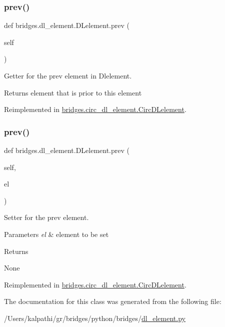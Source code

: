 \subsubsection{\texorpdfstring{prev()}{prev()}\hspace{0.1cm}{\footnotesize\ttfamily [1/2]}}
{\footnotesize\ttfamily def bridges.\+dl\+\_\+element.\+D\+Lelement.\+prev (\begin{DoxyParamCaption}\item[{}]{self }\end{DoxyParamCaption})}



Getter for the prev element in Dlelement. 

\begin{DoxyReturn}{Returns}
element that is prior to this element 
\end{DoxyReturn}


Reimplemented in \mbox{\hyperlink{classbridges_1_1circ__dl__element_1_1_circ_d_lelement_aa2ebe17f407680a6a4fc886ef9516d61}{bridges.\+circ\+\_\+dl\+\_\+element.\+Circ\+D\+Lelement}}.

\mbox{\label{classbridges_1_1dl__element_1_1_d_lelement_a17c371ec0c38e9555e55551d9be4d185}} 
\subsubsection{\texorpdfstring{prev()}{prev()}\hspace{0.1cm}{\footnotesize\ttfamily [2/2]}}
{\footnotesize\ttfamily def bridges.\+dl\+\_\+element.\+D\+Lelement.\+prev (\begin{DoxyParamCaption}\item[{}]{self,  }\item[{}]{el }\end{DoxyParamCaption})}



Setter for the prev element. 


\begin{DoxyParams}{Parameters}
{\em el} & element to be set\\
\hline
\end{DoxyParams}
\begin{DoxyReturn}{Returns}


None 
\end{DoxyReturn}


Reimplemented in \mbox{\hyperlink{classbridges_1_1circ__dl__element_1_1_circ_d_lelement_a0c61c5aefd9fb24c320e9f879d5a2e10}{bridges.\+circ\+\_\+dl\+\_\+element.\+Circ\+D\+Lelement}}.



The documentation for this class was generated from the following file\+:\begin{DoxyCompactItemize}
\item 
/\+Users/kalpathi/gr/bridges/python/bridges/\mbox{\hyperlink{dl__element_8py}{dl\+\_\+element.\+py}}\end{DoxyCompactItemize}
